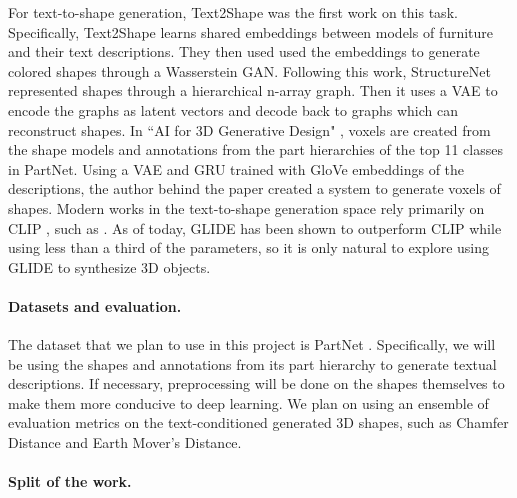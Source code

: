 \documentclass[11pt]{article}
\begin{document}
For text-to-shape generation, Text2Shape \cite{text2shape} was the first work on this task. Specifically, Text2Shape learns shared embeddings between models of furniture and their text descriptions. They then used used the embeddings to generate colored shapes through a Wasserstein GAN. Following this work, StructureNet \cite{structurenet} represented shapes through a hierarchical n-array graph. Then it uses a VAE to encode the graphs as latent vectors and decode back to graphs which can reconstruct shapes. In ``AI for 3D Generative Design" \cite{aifgd}, voxels are created from the shape models and annotations from the part hierarchies of the top 11 classes in PartNet. Using a VAE and GRU trained with GloVe embeddings of the descriptions, the author behind the paper created a system to generate voxels of shapes. Modern works in the text-to-shape generation space rely primarily on CLIP \cite{clip}, such as \cite{clipforge, dream}. As of today, GLIDE \cite{glide} has been shown to outperform CLIP while using less than a third of the parameters, so it is only natural to explore using GLIDE to synthesize 3D objects.


\paragraph*{Datasets and evaluation.}


The dataset that we plan to use in this project is PartNet \cite{partnet}. Specifically, we will be using the shapes and annotations from its part hierarchy to generate textual descriptions. If necessary, preprocessing will be done on the shapes themselves to make them more conducive to deep learning.
We plan on using an ensemble of evaluation metrics on the text-conditioned generated 3D shapes, such as Chamfer Distance and Earth Mover's Distance.
  

\paragraph{Split of the work.}
\end{document}

